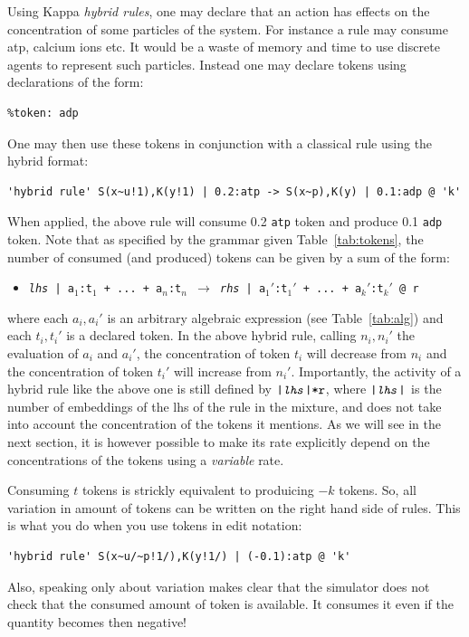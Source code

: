 \documentclass[11pt]{book}
\def\ttt#1{\texttt{#1}}
\def\rar{\rightarrow}
\def\ITE#1{\begin{itemize}#1\end{itemize}}
\def\imp#1{\emph{#1}\index{#1}}
\begin{document}
Using Kappa \imp{hybrid rules}, one may declare that an action has
effects on the concentration of some particles of the system. For
instance a rule may consume atp, calcium ions etc. It would be a waste
of memory and time to use discrete agents to represent such
particles. Instead one may declare tokens using
declarations of the form:
\begin{lstlisting}[language=kappa]
%token: atp
%token: adp
\end{lstlisting}
One may then use these tokens in conjunction with a classical rule
using the hybrid format:
\begin{lstlisting}[language=kappa]
'hybrid rule' S(x~u!1),K(y!1) | 0.2:atp -> S(x~p),K(y) | 0.1:adp @ 'k'
\end{lstlisting}
When applied, the above rule will consume 0.2 \ttt{atp} token and
produce 0.1 \ttt{adp} token. Note that as specified by the grammar
given Table~\ref{tab:tokens}, the number of consumed (and produced)
tokens can be given by a sum of the form: \ITE{
\item[] \ttt{\textit{lhs} | a$_1$:t$_1$ + ... + a$_n$:t$_n$ $\rar$
  \textit{rhs} | a$_1'$:t$_1'$ + ... + a$_k'$:t$_k'$ @ r} } where each
$a_i,a_i'$ is an arbitrary algebraic expression (see Table~\ref{tab:alg}) and each $t_i,t_i'$ is a
declared token. In the above hybrid rule, calling $n_i,n_i'$ the
evaluation of $a_i$ and $a_i'$, the concentration of token $t_i$ will
decrease from $n_i$ and the concentration of token $t_i'$ will
increase from $n_i'$. Importantly, the activity of a
hybrid rule like the above one is still defined by
$\ttt{|\textit{lhs}|*r}$, where $\ttt{|\textit{lhs}|}$ is the number
of embeddings of the lhs of the rule in the mixture, and does not take
into account the concentration of the tokens it mentions. As we will
see in the next section, it is however possible to make its rate
explicitly depend on the concentrations of the tokens using a
\imp{variable} rate.

Consuming $t$ tokens is strickly equivalent to produicing $-k$
tokens. So, all variation in amount of tokens can be written on the
right hand side of rules. This is what you do when you use tokens in
edit notation:
\begin{lstlisting}[language=kappa]
'hybrid rule' S(x~u/~p!1/),K(y!1/) | (-0.1):atp @ 'k'
\end{lstlisting}

Also, speaking only about variation makes clear that the simulator
does not check that the consumed amount of token is available. It
consumes it even if the quantity becomes then negative!
\end{document}
